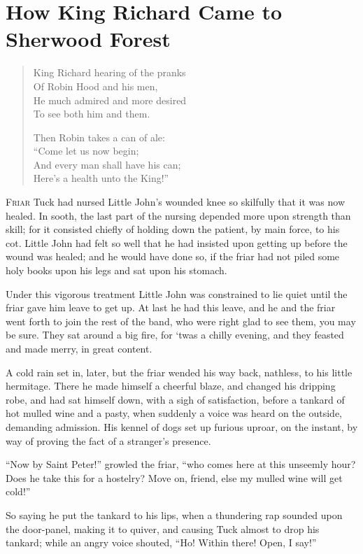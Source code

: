 \chapter{How King Richard Came to Sherwood Forest}

\begin{quote}
King Richard hearing of the pranks\\
Of Robin Hood and his men,\\
He much admired and more desired\\
To see both him and them.

Then Robin takes a can of ale:\\
“Come let us now begin;\\
And every man shall have his can;\\
Here’s a health unto the King!”
\end{quote}

\lettrine{F}{riar} Tuck had nursed Little John's wounded knee so
skilfully that it was now healed. In sooth, the last part of the nursing
depended more upon strength than skill; for it consisted chiefly of
holding down the patient, by main force, to his cot. Little John had felt
so well that he had insisted upon getting up before the wound was healed;
and he would have done so, if the friar had not piled some holy books
upon his legs and sat upon his stomach.

Under this vigorous treatment Little John was constrained to lie quiet
until the friar gave him leave to get up. At last he had this leave, and
he and the friar went forth to join the rest of the band, who were right
glad to see them, you may be sure. They sat around a big fire, for `twas
a chilly evening, and they feasted and made merry, in great content.

A cold rain set in, later, but the friar wended his way back, nathless,
to his little hermitage. There he made himself a cheerful blaze, and
changed his dripping robe, and had sat himself down, with a sigh of
satisfaction, before a tankard of hot mulled wine and a pasty, when
suddenly a voice was heard on the outside, demanding admission. His
kennel of dogs set up furious uproar, on the instant, by way of proving
the fact of a stranger's presence.

``Now by Saint Peter!'' growled the friar, ``who comes here at this
unseemly hour? Does he take this for a hostelry? Move on, friend, else
my mulled wine will get cold!''

So saying he put the tankard to his lips, when a thundering rap sounded
upon the door-panel, making it to quiver, and causing Tuck almost to
drop his tankard; while an angry voice shouted, ``Ho! Within there!
Open, I say!''

